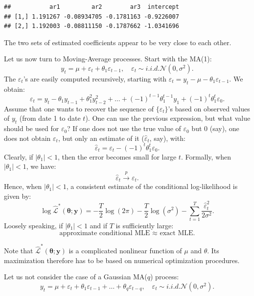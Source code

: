 \documentclass[
  12pt,
]{book}
\theoremstyle{definition}
\theoremstyle{definition}
\theoremstyle{definition}
\theoremstyle{definition}
\theoremstyle{remark}
\begin{document}
\begin{verbatim}
##           ar1         ar2        ar3  intercept
## [1,] 1.191267 -0.08934705 -0.1781163 -0.9226007
## [2,] 1.192003 -0.08811150 -0.1787662 -1.0341696
\end{verbatim}

The two sets of estimated coefficients appear to be very close to each other.

Let us now turn to Moving-Average processes. Start with the MA(1):
\[
y_t = \mu + \varepsilon_t + \theta_1 \varepsilon_{t-1},\quad \varepsilon_t \sim i.i.d.\mathcal{N}(0,\sigma^2).
\]
The \(\varepsilon_t\)'s are easily computed recursively, starting with \(\varepsilon_t = y_t - \mu - \theta_1 \varepsilon_{t-1}\). We obtain:
\[
\varepsilon_t = y_t - \theta_1 y_{t-1} + \theta_1^2 y_{t-2}^2 + \dots + (-1)^{t-1} \theta_1^{t-1} y_{1} + (-1)^t\theta_1^{t}\varepsilon_{0}.
\]
Assume that one wants to recover the sequence of \(\{\varepsilon_t\}\)'s based on observed values of \(y_t\) (from date 1 to date \(t\)). One can use the previous expression, but what value should be used for \(\varepsilon_0\)? If one does not use the true value of \(\varepsilon_0\) but 0 (say), one does not obtain \(\varepsilon_t\), but only an estimate of it (\(\hat\varepsilon_t\), say), with:
\[
\hat\varepsilon_t = \varepsilon_t - (-1)^t\theta_1^{t}\varepsilon_{0}.
\]
Clearly, if \(|\theta_1|<1\), then the error becomes small for large \(t\). Formally, when \(|\theta_1|<1\), we have:
\[
\hat\varepsilon_t \overset{p}{\rightarrow} \varepsilon_t.
\]
Hence, when \(|\theta_1|<1\), a consistent estimate of the conditional log-likelihood is given by:
\begin{equation}
\log \hat{\mathcal{L}}^*(\boldsymbol\theta;\mathbf{y}) = -\frac{T}{2}\log(2\pi) - \frac{T}{2}\log(\sigma^2) - \sum_{t=1}^T \frac{\hat\varepsilon_t^2}{2\sigma^2}.\label{eq:MALstar}
\end{equation}
Loosely speaking, if \(|\theta_1|<1\) and if \(T\) is sufficiently large:
\[
\mbox{approximate conditional MLE $\approx$ exact MLE.}
\]

Note that \(\hat{\mathcal{L}}^*(\boldsymbol\theta;\mathbf{y})\) is a complicated nonlinear function of \(\mu\) and \(\theta\). Its maximization therefore has to be based on numerical optimization procedures.

Let us not consider the case of a Gaussian MA(\(q\)) process:
\begin{equation}
y_t = \mu + \varepsilon_t + \theta_1 \varepsilon_{t-1} + \dots + \theta_q \varepsilon_{t-q} , \quad \varepsilon_t \sim i.i.d.\mathcal{N}(0,\sigma^2). \label{eq:estimMAq}
\end{equation}
\end{document}
